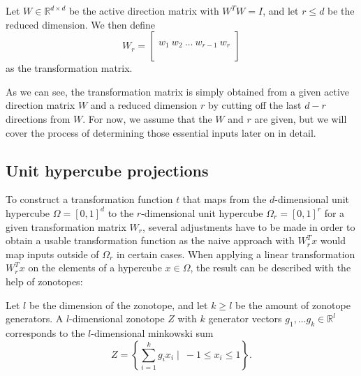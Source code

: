 \documentclass[
  a4paper,  %
  twoside,  %
  bibliography=totoc,
  headsepline,
  cleardoublepage=empty,
  parskip=half,
  draft=false
]{scrbook}
\begin{document}
\begin{definition}
Let $W \in \mathds{R}^{d \times d}$ be the active direction matrix with $W^T W=I$, and let $r \leq d$ be the reduced dimension.
We then define
\begin{equation}
W_r = \begin{bmatrix}
  \\
    w_1 ~ w_2 ~ \dots ~ w_{r-1} ~ w_r\\
    \\
  \end{bmatrix}
\end{equation}
as the transformation matrix.
\end{definition}

As we can see, the transformation matrix is simply obtained from a given active direction matrix $W$ and a reduced dimension $r$ by cutting off the last $d - r$ directions from $W$.
For now, we assume that the $W$ and $r$ are given, but we will cover the process of determining those essential inputs later on in detail.

\subsection{Unit hypercube projections}

To construct a transformation function $t$ that maps from the $d$-dimensional unit hypercube $\Omega=[0,1]^d$ to the $r$-dimensional unit hypercube $\Omega_r=[0,1]^r$ for a given transformation matrix $W_r$, several adjustments have to be made in order to obtain a usable transformation function as the naive approach with $W_r^T x$ would map inputs outside of $\Omega_r$ in certain cases.
When applying a linear transformation $W_r^T x$ on the elements of a hypercube $x \in \Omega$, the result can be described with the help of zonotopes:

\begin{definition}[Zonotope]
Let $l$ be the dimension of the zonotope, and let $k \geq l$ be the amount of zonotope generators.
A $l$-dimensional zonotope $Z$ with $k$ generator vectors $g_1, \dots g_k \in \mathds{R}^l$ corresponds to the $l$-dimensional minkowski sum
\begin{equation}
Z=\left\{\sum_{i=1}^k g_i x_i \mid ~ -1 \leq x_i \leq 1\right\}.
  \label{zonotope}
\end{equation}
\end{definition}
\end{document}
